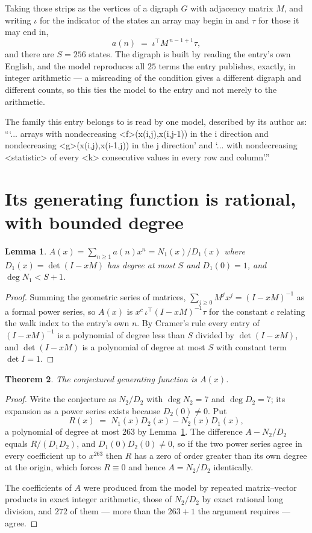 \documentclass[11pt,a4paper]{article}
\theoremstyle{plain}
\newtheorem{theorem}{Theorem}
\newtheorem{lemma}[theorem]{Lemma}
\theoremstyle{definition}
\begin{document}
Taking those strips as the vertices of a digraph $G$ with adjacency matrix $M$, and writing
$\iota$ for the indicator of the states an array may begin in and $\tau$ for those it may end
in,
\[
a(n)\;=\;\iota^{\!\top}M^{\,n-1+1}\tau ,
\]
and there are $S=256$ states. The digraph is built by reading the entry's own English, and the
model reproduces all $25$ terms the entry publishes, exactly, in integer arithmetic --- a
misreading of the condition gives a different digraph and different counts, so this ties the
model to the entry and not merely to the arithmetic.

The family this entry belongs to is read by one model, described by its author as: ```... arrays with nondecreasing <f>(x(i,j),x(i,j-1)) in the i direction and nondecreasing <g>(x(i,j),x(i-1,j)) in the j direction' and `... with nondecreasing <statistic> of every <k> consecutive values in every row and column'.''


\section{Its generating function is rational, with bounded degree}

\begin{lemma}\label{lem:rat}
$A(x)=\sum_{n\ge1}a(n)x^n=N_1(x)/D_1(x)$ where $D_1(x)=\det(I-xM)$ has degree at most
$S$ and $D_1(0)=1$, and $\deg N_1<S+1$.
\end{lemma}

\begin{proof}
Summing the geometric series of matrices, $\sum_{j\ge0}M^jx^j=(I-xM)^{-1}$ as a formal
power series, so $A(x)$ is $x^{c}\,\iota^{\!\top}(I-xM)^{-1}\tau$ for the constant $c$
relating the walk index to the entry's own $n$. By Cramer's rule every entry of
$(I-xM)^{-1}$ is a polynomial of degree less than $S$ divided by $\det(I-xM)$, and
$\det(I-xM)$ is a polynomial of degree at most $S$ with constant term $\det I=1$.
\end{proof}

\begin{theorem}
The conjectured generating function is $A(x)$.
\end{theorem}

\begin{proof}
Write the conjecture as $N_2/D_2$ with $\deg N_2=7$ and $\deg D_2=7$; its expansion as a
power series exists because $D_2(0)\neq0$. Put
\[
R(x)\;=\;N_1(x)D_2(x)-N_2(x)D_1(x),
\]
a polynomial of degree at most $263$ by Lemma~\ref{lem:rat}. The difference
$A-N_2/D_2$ equals $R/(D_1D_2)$, and $D_1(0)D_2(0)\neq0$, so if the two power series agree in
every coefficient up to $x^{263}$ then $R$ has a zero of order greater than its own
degree at the origin, which forces $R\equiv0$ and hence $A=N_2/D_2$ identically.

The coefficients of $A$ were produced from the model by repeated matrix--vector products in
exact integer arithmetic, those of $N_2/D_2$ by exact rational long division, and $272$
of them --- more than the $263+1$ the argument requires --- agree.
\end{proof}
\end{document}
